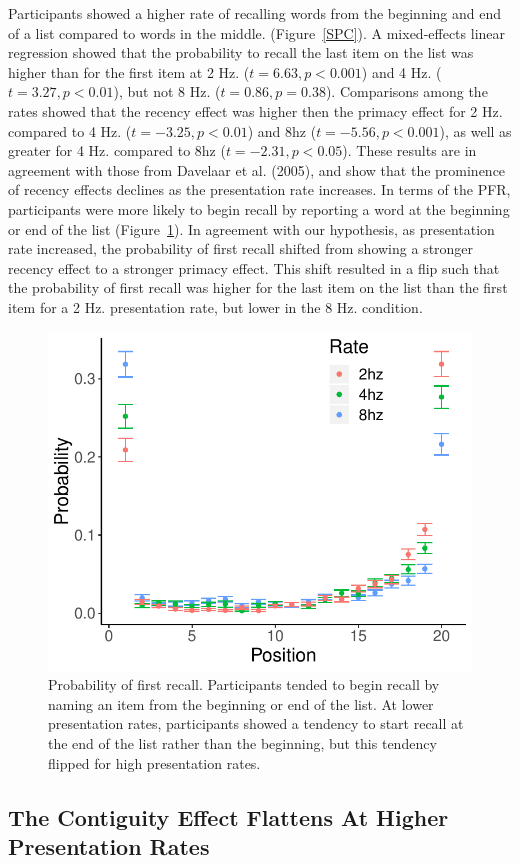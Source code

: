 \documentclass[10pt,letterpaper]{article}
\begin{document}
Participants showed a higher rate of recalling words from the beginning and end of a list compared to words in the middle. (Figure~\ref{SPC}). A mixed-effects linear regression showed that the probability to recall the last item on the list was higher than for the first item at 2 Hz. ($t = 6.63, p < 0.001$) and 4 Hz. ($t = 3.27, p < 0.01$), but not 8 Hz. ($t = 0.86, p = 0.38$). Comparisons among the rates showed that the recency effect was higher then the primacy effect for 2 Hz. compared to 4 Hz. ($t = -3.25, p < 0.01$) and 8hz ($t = -5.56, p < 0.001$), as well as greater for 4 Hz. compared to 8hz ($t = -2.31, p < 0.05$). %
These results are in agreement with those from Davelaar et al. (2005), and show that the prominence of recency effects declines as the presentation rate increases. In terms of the PFR, participants were more likely to begin recall by reporting a word at the beginning or end of the list (Figure~\ref{PFR}). In agreement with our hypothesis, as presentation rate increased, the probability of first recall shifted from showing a stronger recency effect to a stronger primacy effect. This shift resulted in a flip such that the probability of first recall was higher for the last item on the list than the first item for a 2 Hz. presentation rate, but lower in the 8 Hz. condition.
\nocite{DaveEtal05}

\begin{figure}[H]
\begin{center}
\includegraphics[width = .4\textwidth]{Images/PFR_adjusted.pdf}
\end{center}
\caption{Probability of first recall. Participants tended to begin recall by naming an item from the beginning or end of the list. At lower presentation rates, participants showed a tendency to start recall at the end of the list rather than the beginning, but this tendency flipped for high presentation rates.} 
\label{PFR}
\end{figure}

\subsection{The Contiguity Effect Flattens At Higher Presentation Rates}
\end{document}
